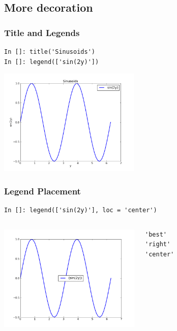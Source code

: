 \documentclass[14pt,compress]{beamer}
\begin{document}
\subsection{More decoration}
\begin{frame}[fragile]
\frametitle{Title and Legends}
\vspace*{-0.15in}
\begin{lstlisting}
In []: title('Sinusoids')
In []: legend(['sin(2y)'])
\end{lstlisting}
  \vspace*{-0.1in}
  \begin{center}
  \includegraphics[height=2in, interpolate=true]{data/legend}  
  \end{center}
\end{frame}

\begin{frame}[fragile]
\frametitle{Legend Placement}
\begin{block}{}
    \small
\begin{lstlisting}
In []: legend(['sin(2y)'], loc = 'center')
\end{lstlisting}
\end{block}

\begin{columns}
 \includegraphics[height=2in, interpolate=true]{data/position}  
\vspace{-0.2in}
\begin{lstlisting}
'best' 
'right'
'center'
\end{lstlisting}
\end{columns}
\end{frame}
\end{document}
